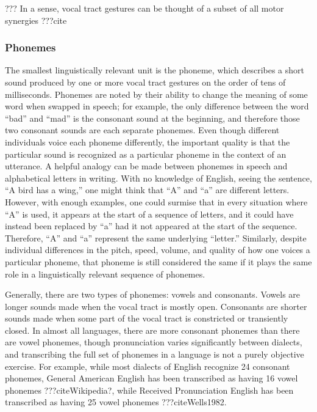 ??? In a sense, vocal tract gestures
can be thought of a subset of all
motor synergies ???cite

\subsubsection{Phonemes}

The smallest linguistically relevant unit
is the phoneme, which describes
a short sound produced by one or more
vocal tract gestures
on the order of tens of milliseconds.
Phonemes are noted by their ability
to change the meaning of some word
when swapped in speech;
for example, the only difference between
the word ``bad'' and ``mad'' is the
consonant sound at the beginning,
and therefore those two consonant sounds
are each separate phonemes.
Even though different individuals
voice each phoneme differently,
the important quality is that
the particular sound is recognized
as a particular phoneme
in the context of an utterance.
A helpful analogy can be made between
phonemes in speech
and alphabetical letters in writing.
With no knowledge of English,
seeing the sentence,
``A bird has a wing,''
one might think that ``A'' and ``a''
are different letters.
However, with enough examples,
one could surmise that in every situation
where ``A'' is used, it appears at the
start of a sequence of letters,
and it could have instead
been replaced by ``a''
had it not appeared at the start of the sequence.
Therefore, ``A'' and ``a'' represent
the same underlying ``letter.''
Similarly, despite individual differences
in the pitch, speed, volume, and quality
of how one voices a particular phoneme,
that phoneme is still considered the same
if it plays the same role
in a linguistically relevant sequence of phonemes.

Generally, there are two types of phonemes:
vowels and consonants.
Vowels are longer sounds
made when the vocal tract is mostly open.
Consonants are shorter sounds
made when some part of the vocal tract
is constricted or transiently closed.
In almost all languages,
there are more consonant phonemes
than there are vowel phonemes,
though pronunciation varies significantly
between dialects,
and transcribing the full set of
phonemes in a language is
not a purely objective exercise.
For example, while most dialects
of English recognize 24 consonant phonemes,
General American English has been transcribed
as having 16 vowel phonemes ???citeWikipedia?,
while Received Pronunciation English
has been transcribed as having 25 vowel phonemes
???citeWells1982.

